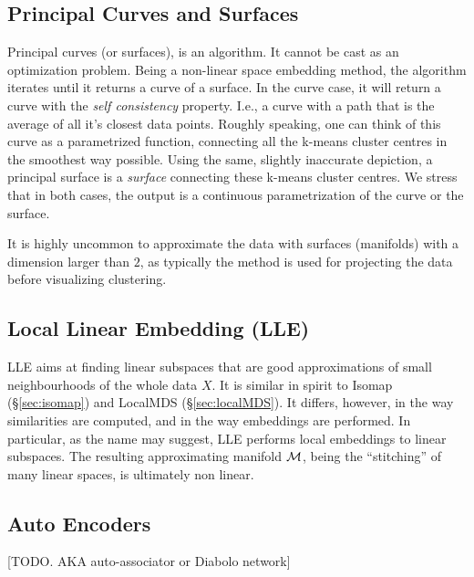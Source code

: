 \documentclass[12pt,a4paper]{article}
\begin{document}
\subsection{Principal Curves and Surfaces}


Principal curves (or surfaces), is an algorithm. It cannot be cast as an optimization problem.
Being a non-linear space embedding method, the algorithm iterates until it returns a curve of a surface.
In the curve case, it will return a curve with the \emph{self consistency} property. I.e., a curve with a path that is the average of all it's closest data points.
Roughly speaking, one can think of this curve as a parametrized function, connecting all the k-means cluster centres in the smoothest way possible.
Using the same, slightly inaccurate depiction, a principal surface is a \emph{surface} connecting these k-means cluster centres.
We stress that in both cases, the output is a continuous parametrization of the curve or the surface.

It is highly uncommon to approximate the data with surfaces (manifolds) with a dimension larger than $2$, as typically the method is used for projecting the data before visualizing \andor clustering.






\subsection{Local Linear Embedding (LLE)}
\label{sec:lle}



LLE aims at finding linear subspaces that are good approximations of small neighbourhoods of the whole data $X$.
It is similar in spirit to Isomap (\S\ref{sec:isomap}) and LocalMDS (\S\ref{sec:localMDS}).
It differs, however, in the way similarities are computed, and in the way embeddings are performed. 
In particular, as the name may suggest, LLE performs local embeddings to linear subspaces. The resulting approximating manifold $\mathcal{M}$, being the ``stitching'' of many linear spaces, is ultimately non linear.




\subsection{Auto Encoders}
\label{sec:auto_encoders}
[TODO. AKA auto-associator or Diabolo network]
\end{document}

